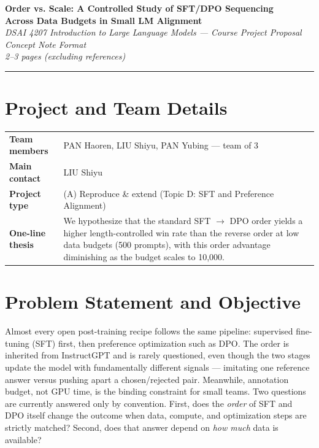 \documentclass[11pt]{article}
\begin{document}
{\centering
{\LARGE \textbf{Order vs. Scale: A Controlled Study of SFT/DPO Sequencing\\ Across Data Budgets in Small LM Alignment}}\\[0.2em]
{\large \textcolor{PolyUBlue}{\textit{DSAI 4207 Introduction to Large Language Models --- Course Project Proposal}}}\\[0.2em]
{\normalsize \textit{Concept Note Format}}\\[0.3em]
{\normalsize \textit{2--3 pages (excluding references)}}\\[0.5em]
\par}

\vspace{0.1em}
\textcolor{PolyUBlue}{\rule{\linewidth}{0.8pt}}
\vspace{0.5em}

\section*{Project and Team Details}
\begin{tabularx}{\linewidth}{@{}l X@{}}
\toprule
\textbf{Team members} & PAN Haoren, LIU Shiyu, PAN Yubing --- team of 3 \\
\textbf{Main contact} & LIU Shiyu \\
\textbf{Project type} & (A) Reproduce \& extend (Topic D: SFT and Preference Alignment) \\
\textbf{One-line thesis} & We hypothesize that the standard SFT $\rightarrow$ DPO order yields a higher length-controlled win rate than the reverse order at low data budgets (500 prompts), with this order advantage diminishing as the budget scales to 10{,}000. \\
\bottomrule
\end{tabularx}

\section{Problem Statement and Objective}

Almost every open post-training recipe follows the same pipeline: supervised fine-tuning (SFT) first, then preference optimization such as DPO. The order is inherited from InstructGPT and is rarely questioned, even though the two stages update the model with fundamentally different signals --- imitating one reference answer versus pushing apart a chosen/rejected pair. Meanwhile, annotation budget, not GPU time, is the binding constraint for small teams. Two questions are currently answered only by convention. First, does the \emph{order} of SFT and DPO itself change the outcome when data, compute, and optimization steps are strictly matched? Second, does that answer depend on \emph{how much} data is available?
\end{document}
